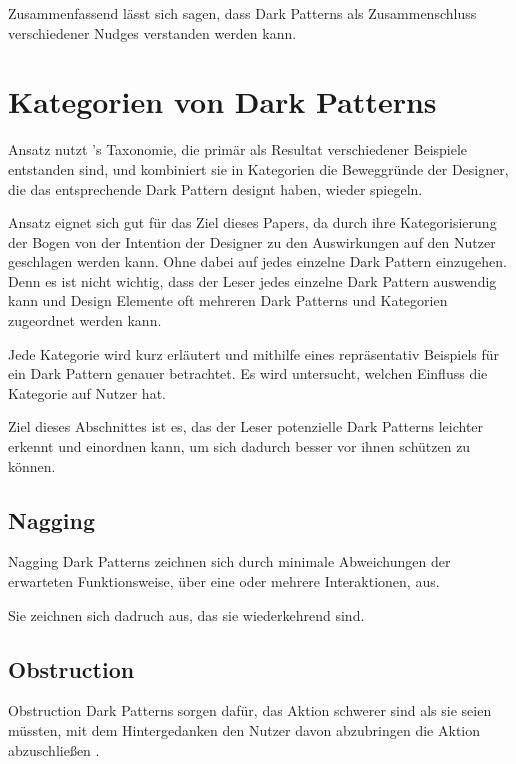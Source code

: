 \documentclass[conference,compsoc,final,a4paper]{IEEEtran}
\begin{document}
Zusammenfassend lässt sich sagen, dass Dark Patterns als Zusammenschluss verschiedener Nudges verstanden werden kann.

\section{Kategorien von Dark Patterns}

\citeauthor{Gray_2018} Ansatz nutzt \citeauthor{Brignull}'s Taxonomie, die primär als Resultat verschiedener Beispiele entstanden sind, und kombiniert sie in Kategorien die Beweggründe der Designer, die das entsprechende Dark Pattern designt haben, wieder spiegeln.

\citeauthor{Gray_2018} Ansatz eignet sich gut für das Ziel dieses Papers, da durch ihre Kategorisierung der Bogen von der Intention der Designer zu den Auswirkungen auf den Nutzer geschlagen werden kann. Ohne dabei auf jedes einzelne Dark Pattern einzugehen. Denn es ist nicht wichtig, dass der Leser jedes einzelne Dark Pattern auswendig kann und Design Elemente oft mehreren Dark Patterns und Kategorien zugeordnet werden kann.

Jede Kategorie wird kurz erläutert und mithilfe eines repräsentativ Beispiels für ein Dark Pattern genauer betrachtet. Es wird untersucht, welchen Einfluss die Kategorie auf Nutzer hat.

Ziel dieses Abschnittes ist es, das der Leser potenzielle Dark Patterns leichter erkennt und einordnen kann, um sich dadurch besser vor ihnen schützen zu können.


\subsection{Nagging}
Nagging Dark Patterns zeichnen sich durch minimale Abweichungen der erwarteten Funktionsweise, über eine oder mehrere Interaktionen, aus.

Sie zeichnen sich dadruch aus, das sie wiederkehrend sind.


\subsection{Obstruction}
\label{chap:Obstruction}
Obstruction Dark Patterns sorgen dafür, das Aktion schwerer sind als sie seien müssten, mit dem Hintergedanken den Nutzer davon abzubringen die Aktion abzuschließen \autocite{Gray_2018}.
\end{document}
